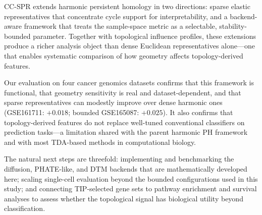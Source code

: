 \documentclass[11pt]{article}
\begin{document}
CC-SPR extends harmonic persistent homology in two directions: sparse elastic representatives that concentrate cycle support for interpretability, and a backend-aware framework that treats the sample-space metric as a selectable, stability-bounded parameter.
Together with topological influence profiles, these extensions produce a richer analysis object than dense Euclidean representatives alone---one that enables systematic comparison of how geometry affects topology-derived features.

Our evaluation on four cancer genomics datasets confirms that this framework is functional, that geometry sensitivity is real and dataset-dependent, and that sparse representatives can modestly improve over dense harmonic ones (GSE161711: $+0.018$; bounded GSE165087: $+0.025$).
It also confirms that topology-derived features do not replace well-tuned conventional classifiers on prediction tasks---a limitation shared with the parent harmonic PH framework and with most TDA-based methods in computational biology.

The natural next steps are threefold: implementing and benchmarking the diffusion, PHATE-like, and DTM backends that are mathematically developed here; scaling single-cell evaluation beyond the bounded configurations used in this study; and connecting TIP-selected gene sets to pathway enrichment and survival analyses to assess whether the topological signal has biological utility beyond classification.
\end{document}
